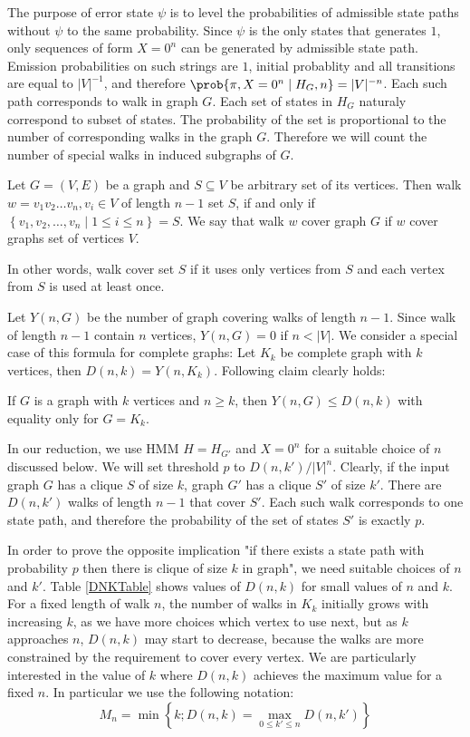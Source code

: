 The purpose of error state $\psi$ is to level the probabilities of admissible
state paths without $\psi$ to the same probability. Since $\psi$ is the only
states that generates $1$, only sequences of form $X=0^n$ can be generated by
admissible state path. Emission probabilities on such strings are $1$, initial
probablity and all transitions are equal to $|V|^{-1}$, and therefore
$\prob{\pi, X=0^n\mid H_G,n} = |V|^{-n}$.  Each such path corresponds to walk in
graph $G$. Each set of states in $H_G$ naturaly correspond to subset of states.
The probability of the set is proportional to the number of corresponding walks
in the graph $G$. Therefore we will count the number of special walks in induced subgraphs of $G$.

\begin{definition}
Let $G=(V, E)$ be a graph and $S\subseteq V$ be arbitrary set of its vertices.
Then walk $w=v_1v_2\dots v_n, v_i\in V$ of length $n-1$  set
$S$, if and only if $\left\{v_1, v_2, \dots, v_n\mid 1\leq i\leq n\right\}=S$. 
We say that walk $w$ cover graph $G$ if $w$ cover graphs set of vertices $V$.

In other words, walk cover set $S$ if it uses only vertices from $S$ and each
vertex from $S$ is used at least once.
\end{definition}

Let $Y(n, G)$ be the number of graph covering walks of length $n-1$. Since walk
of length $n - 1$ contain $n$ vertices, $Y(n, G)=0$ if $n<|V|$. We consider a
special case of this formula for complete graphs: Let $K_k$ be
complete graph with $k$ vertices, then $D(n, k) = Y(n, K_k)$. Following claim
clearly holds:

\begin{lemma}\label{NotCliqueIsSmaller}
If $G$ is a graph with $k$ vertices and $n\ge k$, then
$Y(n,G)\le D(n,k)$ with equality only for $G=K_k$. 
\end{lemma}

In our reduction, we use HMM $H=H_{G'}$ and $X=0^n$ for a suitable
choice of $n$ discussed below. We will set threshold $p$ to
$D(n,k')/|V|^{n}$. Clearly, if the input graph $G$ has a clique $S$ of
size $k$, graph $G'$ has a clique $S'$ of size $k'$. There
are $D(n,k')$ walks of length $n-1$ that cover $S'$. Each such walk
corresponds to one state path, and therefore the probability of
the set of states $S'$ is exactly $p$. 

In order to prove the opposite implication "if there exists a state path with
probability $p$ then there is clique of size $k$ in graph", we need suitable choices
of $n$ and $k'$. Table \ref{DNKTable} shows values of $D(n,k)$ for
small values of $n$ and $k$. For a fixed length of walk $n$, the
number of walks in $K_k$ initially grows with increasing $k$, as we
have more choices which vertex to use next, but as $k$ approaches $n$,
$D(n,k)$  may start to decrease, because the walks are more constrained by
the requirement to cover every vertex. We are particularly interested in
the value of $k$ where $D(n,k)$ achieves the maximum value for a fixed $n$. 
In particular we use the following notation:
$$M_{n} = \min\left\{k ; D(n,k) = \max_{0\leq k'\leq
  n}D(n,k')\right\}$$
  

